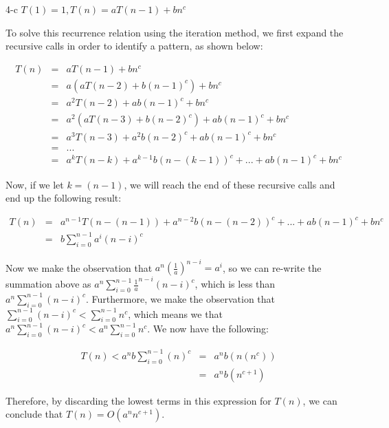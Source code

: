 \documentclass[11pt]{article}
\begin{document}
\begin{prob}{4-c}
$T(1) = 1, T(n) = aT(n-1) + bn^{c}$
\end{prob}
\begin{sol} 

To solve this recurrence relation using the iteration method, we first expand the recursive calls in order to identify a pattern, as shown below:

\begin{eqnarray*}
T(n) & = & aT(n-1) + bn^c \\
& = & a(aT(n-2) + b(n-1)^c) + bn^c \\
& = & a^2T(n-2) + ab(n-1)^c + bn^c\\
& = & a^2(aT(n-3) + b(n-2)^c) + ab(n-1)^c + bn^c \\
& = & a^3T(n-3) + a^2b(n-2)^c + ab(n-1)^c + bn^c \\
& = & ... \\
& = & a^kT(n-k) + a^{k-1}b(n-(k-1))^c + ... + ab(n-1)^c + bn^c
\end{eqnarray*}

Now, if we let $k = (n-1)$, we will reach the end of these recursive calls and end up the following result:

\begin{eqnarray*}
T(n) & = & a^{n-1}T(n-(n-1)) + a^{n-2}b(n-(n-2))^c + ... + ab(n-1)^c + bn^c \\
& = & b\sum_{i=0}^{n-1} a^i(n-i)^c
\end{eqnarray*}

Now we make the observation that $a^n(\frac{1}{a})^{n-i} = a^{i}$, so we can re-write the summation above as $a^{n}\sum_{i=0}^{n-1} \frac{1}{a}^{n-i}(n-i)^c$, which is less than $a^{n}\sum_{i=0}^{n-1} (n-i)^c$. Furthermore, we make the observation that $\sum_{i=0}^{n-1} (n-i)^c < \sum_{i=0}^{n-1} n^c$, which means we that $a^{n}\sum_{i=0}^{n-1} (n-i)^c < a^{n}\sum_{i=0}^{n-1} n^c$. We now have the following:

\begin{eqnarray*}
T(n) < a^{n}b\sum_{i=0}^{n-1} (n)^c & = & a^{n}b(n(n^c))\\
& = & a^{n}b(n^{c+1})
\end{eqnarray*}

Therefore, by discarding the lowest terms in this expression for $T(n)$, we can conclude that $T(n) = O(a^nn^{c+1})$.

\end{sol}
\end{document}
